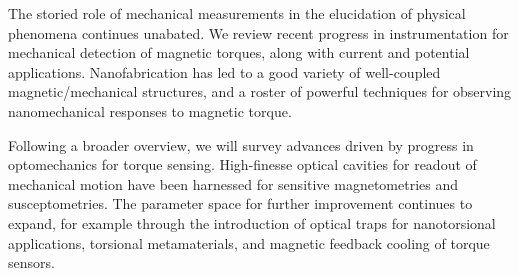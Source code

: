 The storied role of mechanical measurements in the elucidation of physical phenomena continues unabated.  We review recent progress in instrumentation for mechanical detection of magnetic torques, along with current and potential applications.  Nanofabrication has led to a good variety of well-coupled magnetic/mechanical structures, and a roster of powerful techniques for observing nanomechanical responses to magnetic torque.  

Following a broader overview\cite{Moreland_2003,Lipfert_2014,Forstner_2014,Zhang_2016}, we will survey advances driven by progress in optomechanics for torque sensing.  High-finesse optical cavities for readout of mechanical motion have been harnessed for sensitive magnetometries and susceptometries\cite{Kim_2013,Wu_2014}.  The parameter space for further improvement continues to expand, for example through the introduction of optical traps for nanotorsional applications, torsional metamaterials, and magnetic feedback cooling of torque sensors\cite{Hoang_2016,Frenzel_2017,Kim_2017}.